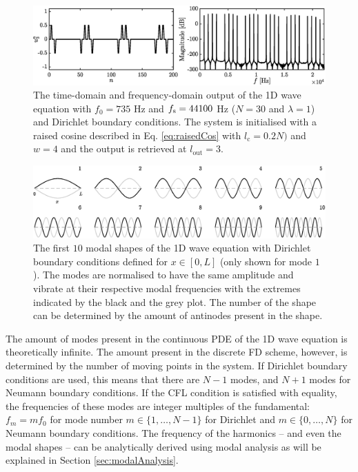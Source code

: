 \begin{figure}[h]
    \includegraphics[width=\textwidth]{figures/fdtd/oneDWaveOutput.eps}
    \caption{The time-domain and frequency-domain output of the 1D wave equation with $f_0 = 735$ Hz and $f_\text{s} = 44100$ Hz ($N = 30$ and $\lambda = 1$) and Dirichlet boundary conditions. The system is initialised with a raised cosine described in Eq. \eqref{eq:raisedCos} with $l_\text{c} = 0.2N)$ and $w=4$ and the output is retrieved at $l_\text{out} = 3$. \label{fig:1DWaveOutput}}
\end{figure}

\begin{figure}[h]
    \includegraphics[width=\textwidth]{figures/fdtd/modes.eps}
    \caption{The first $10$ modal shapes of the 1D wave equation with Dirichlet boundary conditions defined for $x\in[0, L]$ (only shown for mode $1$). The modes are normalised to have the same amplitude and vibrate at their respective modal frequencies with the extremes indicated by the black and the grey plot. The number of the shape can be determined by the amount of antinodes present in the shape. \label{fig:modes}}
\end{figure}

The amount of modes present in the continuous PDE of the 1D wave equation is theoretically infinite. The amount present in the discrete FD scheme, however, is determined by the number of moving points in the system. If Dirichlet boundary conditions are used, this means that there are $N-1$ modes, and $N+1$ modes for Neumann boundary conditions. If the CFL condition is satisfied with equality, the frequencies of these modes are integer multiples of the fundamental: $f_m = mf_0$ for mode number $m \in \{1, \hdots, N-1\}$ for Dirichlet and $m \in \{0, \hdots, N\}$ for Neumann boundary conditions. The frequency of the harmonics -- and even the modal shapes -- can be analytically derived using modal analysis as will be explained in Section \ref{sec:modalAnalysis}.

